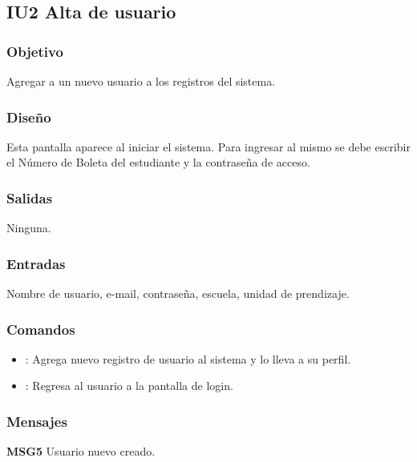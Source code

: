 \subsection{IU2 Alta de usuario}

\subsubsection{Objetivo}
	Agregar a un nuevo usuario a los registros del sistema.

\subsubsection{Diseño}
	Esta pantalla aparece al iniciar el sistema. Para ingresar al mismo se debe escribir el Número de Boleta del estudiante y la contraseña de acceso. 


\subsubsection{Salidas}

	Ninguna.

\subsubsection{Entradas}
Nombre de usuario, e-mail, contrase\~na, escuela, unidad de prendizaje.

\subsubsection{Comandos}
\begin{itemize}
	\item {}: Agrega nuevo registro de usuario al sistema y lo lleva a su perfil.
	
	\item {}: Regresa al usuario a la pantalla de login.
	
\end{itemize}

\subsubsection{Mensajes}
	\begin{Citemize}
		\item {\bf MSG5} Usuario nuevo creado.
	\end{Citemize}